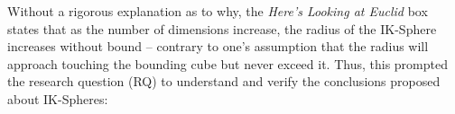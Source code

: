 Without a rigorous explanation as to why, the \textit{Here's Looking at Euclid} box states that as the number of dimensions increase, the radius of the IK-Sphere increases without bound -- contrary to one's assumption that the radius will approach touching the bounding cube but never exceed it. Thus, this prompted the research question (RQ) to understand and verify the conclusions proposed about IK-Spheres: \researchquestion{}














